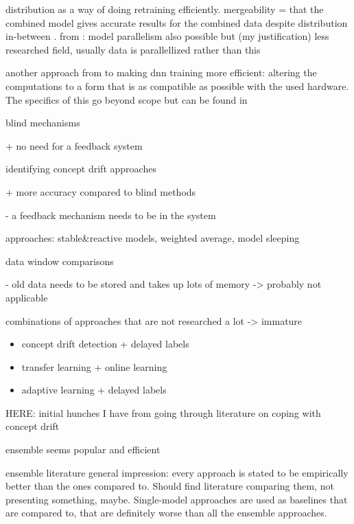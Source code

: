 distribution as a way of doing retraining efficiently. mergeability =  that the combined model gives accurate results for the combined data despite distribution in-between \cite{bifet_machine_2017}. from \cite{ben-nun_demystifying_2019}: model parallelism also possible but (my justification) less researched field, usually data is parallellized rather than this

another approach from \cite{ben-nun_demystifying_2019} to making dnn training more efficient: altering the computations to a form that is as compatible as possible with the used hardware. The specifics of this go beyond scope but can be found in \cite{ben-nun_demystifying_2019}

blind mechanisms

+ no need for a feedback system

identifying concept drift approaches

+ more accuracy compared to blind methods \cite{conceptdriftsurvey}

- a feedback mechanism needs to be in the system

approaches: stable\&reactive models, weighted average, model sleeping \cite{conceptdriftsurvey}

data window comparisons

- old data needs to be stored and takes up lots of memory \cite{conceptdriftsurvey} -> probably not applicable

combinations of approaches that are not researched a lot -> immature

\begin{itemize}
    \item concept drift detection + delayed labels \cite{mlforstreamingsurvey}
    \item transfer learning + online learning \cite{mlforstreamingsurvey}
    \item adaptive learning + delayed labels \cite{mlforstreamingsurvey}
\end{itemize}

HERE: initial hunches I have from going through literature on coping with concept drift

ensemble seems popular and efficient

ensemble literature general impression: every approach is stated to be empirically better than the ones compared to. Should find literature comparing them, not presenting something, maybe. Single-model approaches are used as baselines that are compared to, that are definitely worse than all the ensemble approaches.



